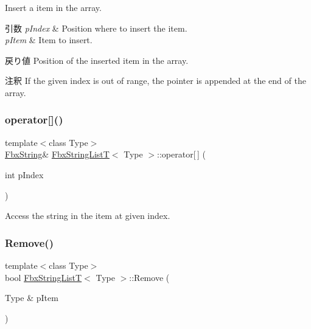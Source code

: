 Insert a item in the array. 
\begin{DoxyParams}{引数}
{\em p\+Index} & Position where to insert the item. \\
\hline
{\em p\+Item} & Item to insert. \\
\hline
\end{DoxyParams}
\begin{DoxyReturn}{戻り値}
Position of the inserted item in the array. 
\end{DoxyReturn}
\begin{DoxyRemark}{注釈}
If the given index is out of range, the pointer is appended at the end of the array. 
\end{DoxyRemark}
\mbox{\label{class_fbx_string_list_t_a40ae970b4cbfd3df9117db1c3218b062}} 
\subsubsection{\texorpdfstring{operator[]()}{operator[]()}}
{\footnotesize\ttfamily template$<$class Type$>$ \\
\hyperlink{class_fbx_string}{Fbx\+String}\& \hyperlink{class_fbx_string_list_t}{Fbx\+String\+ListT}$<$ Type $>$\+::operator\mbox{[}$\,$\mbox{]} (\begin{DoxyParamCaption}\item[{int}]{p\+Index }\end{DoxyParamCaption})}



Access the string in the item at given index. 

\mbox{\label{class_fbx_string_list_t_aa9085a3f134422ecebbd406d0ce2025d}} 
\subsubsection{\texorpdfstring{Remove()}{Remove()}\hspace{0.1cm}{\footnotesize\ttfamily [1/2]}}
{\footnotesize\ttfamily template$<$class Type$>$ \\
bool \hyperlink{class_fbx_string_list_t}{Fbx\+String\+ListT}$<$ Type $>$\+::Remove (\begin{DoxyParamCaption}\item[{Type \&}]{p\+Item }\end{DoxyParamCaption})}



